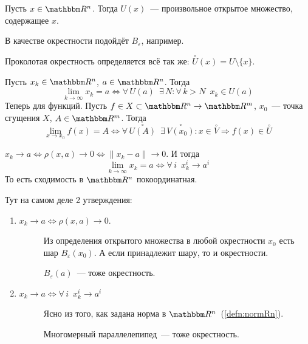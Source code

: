 \documentclass[12pt]{../../notes}
\begin{document}
\begin{defn}[Окрестность в $\R^n$]\label{defn:neightbRn}
  Пусть $x\in \R^n$. Тогда $U(x)$~--- произвольное открытое множество, содержащее $x$. 
\end{defn}
\begin{exmp*}
  В качестве окрестности подойдёт $B_\varepsilon$, например.
\end{exmp*}
\begin{rem*}
  Проколотая окрестность определяется всё так же: $\overset{\circ}{U}(x) = U \setminus \{x\}$.
\end{rem*}

\begin{defn}[Предел в $\R^n$]\label{defn:limtop}
  Пусть $x_k\in \R^n$, $a\in \R^n$. Тогда 
  \[
    \lim_{k\to \infty} x_k = a \Leftrightarrow \forall\, U(a) \;\: \exists\, N\colon
    \forall\, k > N \;\: x_k \in U(a)
  \]
  Теперь для функций. 
  Пусть $f\in X \subset \R^n \to \R^m$, $x_0$~--- точка сгущения $X$, $A\in \R^m$. Тогда 
  \[
    \lim_{x\to x_0} f(x) = A \Leftrightarrow \forall\, \overset{\circ}{U(A)} \;\:
    \exists\, \overset{\circ}{V(x_0)} \colon x\in \overset{\circ}{V} \Rightarrow f(x) \in \overset{\circ}{U}
  \]
\end{defn}

\begin{stat}\label{stat:limcoordRn}
  $x_k \to a \Leftrightarrow \rho(x,a) \to 0 \Leftrightarrow \| x_k - a \| \to 0$.
  И тогда 
  \[
    \lim_{k\to \infty} x_k = a \Leftrightarrow \forall\, i \;\: x_k^i \to a^i
  \]
  То есть сходимость в $\R^n$ покоординатная. 
\end{stat}
\begin{itlproof}
  Тут на самом деле 2 утверждения:
  \begin{enumerate}
    \item $x_k \to a \Leftrightarrow \rho(x, a) \to 0$.
      \begin{description}
        \item[\circlearound{$\Leftarrow$}] Из определения открытого множества в любой окрестности $x_0$ 
          есть шар $B_\varepsilon(x_0)$. А если принадлежит шару, то и окрестности.
        \item[\circlearound{$\Rightarrow$}] $B_\varepsilon(a)$~--- тоже окрестность. 
      \end{description}
    \item $ x_k \to a \Leftrightarrow \forall\, i \;\: x_k^i \to a^i$
      \begin{description}
        \item[\circlearound{$\Leftarrow$}] Ясно из того, как задана норма в $\R^n$~(\ref{defn:normRn}).
        \item[\circlearound{$\Rightarrow$}] Многомерный параллелепипед~--- тоже окрестность. 
      \end{description}
  \end{enumerate}
\end{itlproof}
\end{document}
